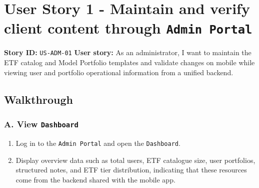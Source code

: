 \section{User Story 1 - Maintain and verify client content through \texttt{Admin Portal}}
\textbf{Story ID:} \texttt{US-ADM-01}
\textbf{User story:} As an administrator, I want to maintain the ETF catalog and Model Portfolio templates and validate changes on mobile while viewing user and portfolio operational information from a unified backend.
\subsection{Walkthrough}
\subsubsection{A. View \texttt{Dashboard}}
\begin{enumerate}
\item Log in to the \texttt{Admin Portal} and open the \texttt{Dashboard}.
\item Display overview data such as total users, ETF catalogue size, user portfolios, structured notes, and ETF tier distribution, indicating that these resources come from the backend shared with the mobile app.
\end{enumerate}

